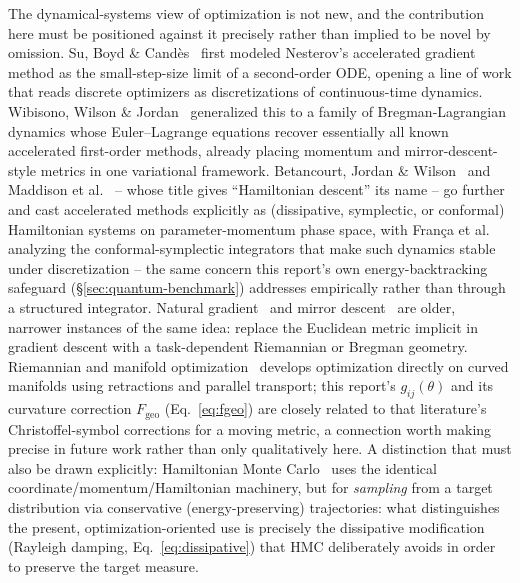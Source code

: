 \documentclass[10pt,twocolumn]{article}
\begin{document}
The dynamical-systems view of optimization is not new, and the contribution
here must be positioned against it precisely rather than implied to be
novel by omission. Su, Boyd \& Cand\`es~\cite{su2016differential} first
modeled Nesterov's accelerated gradient method as the small-step-size limit
of a second-order ODE, opening a line of work that reads discrete optimizers
as discretizations of continuous-time dynamics.
Wibisono, Wilson \& Jordan~\cite{wibisono2016variational} generalized this to
a family of Bregman-Lagrangian dynamics whose Euler--Lagrange equations
recover essentially all known accelerated first-order methods, already
placing momentum and mirror-descent-style metrics in one variational
framework. Betancourt, Jordan \& Wilson~\cite{betancourt2018symplectic}
and Maddison et al.~\cite{maddison2018hamiltonian} -- whose title gives
``Hamiltonian descent'' its name -- go further and cast
accelerated methods explicitly as (dissipative, symplectic, or conformal)
Hamiltonian systems on parameter-momentum phase space, with
Fran\c ca et al.~\cite{franca2021conformal} analyzing the conformal-symplectic
integrators that make such dynamics stable under discretization -- the same
concern this report's own energy-backtracking safeguard
(\S\ref{sec:quantum-benchmark}) addresses empirically rather than through a
structured integrator. Natural gradient~\cite{amari1998natural} and mirror
descent~\cite{nemirovski1983problem} are older, narrower instances of the
same idea: replace the Euclidean metric implicit in gradient descent with a
task-dependent Riemannian or Bregman geometry. Riemannian and manifold
optimization~\cite{absil2008optimization} develops optimization directly on
curved manifolds using retractions and parallel transport; this report's
$g_{ij}(\theta)$ and its curvature correction $F_{\mathrm{geo}}$
(Eq.~\eqref{eq:fgeo}) are closely related to that literature's
Christoffel-symbol corrections for a moving metric, a connection worth
making precise in future work rather than only qualitatively here. A
distinction that must also be drawn explicitly: Hamiltonian Monte
Carlo~\cite{betancourt2017conceptual} uses the identical
coordinate/momentum/Hamiltonian machinery, but for \emph{sampling} from a
target distribution via conservative (energy-preserving) trajectories:
what distinguishes the present, optimization-oriented use is precisely the
dissipative modification (Rayleigh damping, Eq.~\eqref{eq:dissipative}) that
HMC deliberately avoids in order to preserve the target measure.
\end{document}
